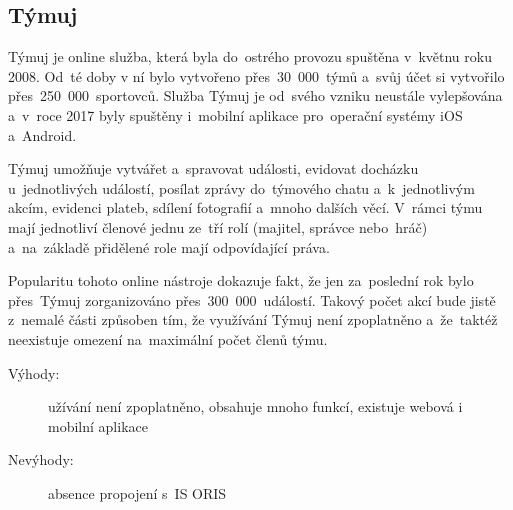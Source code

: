 \subsection{Týmuj}
Týmuj je online služba, která byla do~ostrého provozu spuštěna v~květnu roku 2008. Od~té doby v ní bylo vytvořeno přes~30~000~týmů a~svůj účet si vytvořilo přes~250~000~sportovců. Služba Týmuj je od~svého vzniku neustále vylepšována a~v~roce 2017 byly spuštěny i~mobilní aplikace pro~operační systémy iOS a~Android.

Týmuj umožňuje vytvářet a~spravovat události, evidovat docházku u~jednotlivých událostí, posílat zprávy do~týmového chatu a~k~jednotlivým akcím, evidenci plateb, sdílení fotografií a~mnoho dalších věcí. V~rámci týmu mají jednotliví členové jednu ze~tří rolí (majitel, správce nebo~hráč) a~na~základě přidělené role mají odpovídající práva.

Popularitu tohoto online nástroje dokazuje fakt, že jen za~poslední rok bylo přes~Týmuj zorganizováno přes~300~000~událostí. Takový počet akcí bude jistě z~nemalé části způsoben tím, že využívání Týmuj není zpoplatněno a~že~taktéž neexistuje omezení na~maximální počet členů týmu. \cite{tymuj}

\begin{description}
	\item[Výhody:] užívání není zpoplatněno, obsahuje mnoho funkcí, existuje webová i mobilní aplikace
	\item[Nevýhody:] absence propojení s~IS ORIS
\end{description}
\newpage
